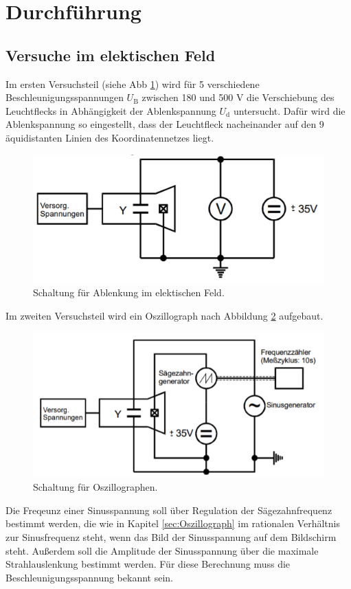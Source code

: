 \section{Durchführung}
\label{sec:Durchführung}

\subsection{Versuche im elektischen Feld}

Im ersten Versuchsteil (siehe Abb \ref{fig:V1}) wird für 5 verschiedene Beschleunigungsspannungen $U_\text{B}$ zwischen 180 und 500 V die Verschiebung des Leuchtflecks in Abhängigkeit der Ablenkspannung $U_\text{d}$ untersucht.
Dafür wird die Ablenkspannung so eingestellt, dass der Leuchtfleck nacheinander auf den 9 äquidistanten Linien des Koordinatennetzes liegt.
\begin{figure}
  \centering
  \includegraphics{data/V1.png}
  \caption{Schaltung für Ablenkung im elektischen Feld.}
  \label{fig:V1}
\end{figure}

Im zweiten Versuchsteil wird ein Oszillograph nach Abbildung \ref{fig:V2} aufgebaut.
\begin{figure}
  \centering
  \includegraphics{data/V2.png}
  \caption{Schaltung für Oszillographen.}
  \label{fig:V2}
\end{figure}
Die Freqeunz einer Sinusspannung soll über Regulation der Sägezahnfrequenz bestimmt werden, die wie in Kapitel \ref{sec:Oszillograph} im rationalen Verhältnis zur Sinusfrequenz steht, wenn das Bild der Sinusspannung auf dem Bildschirm steht.
Außerdem soll die Amplitude der Sinusspannung über die maximale Strahlauslenkung bestimmt werden.
Für diese Berechnung muss die Beschleunigungsspannung bekannt sein.

